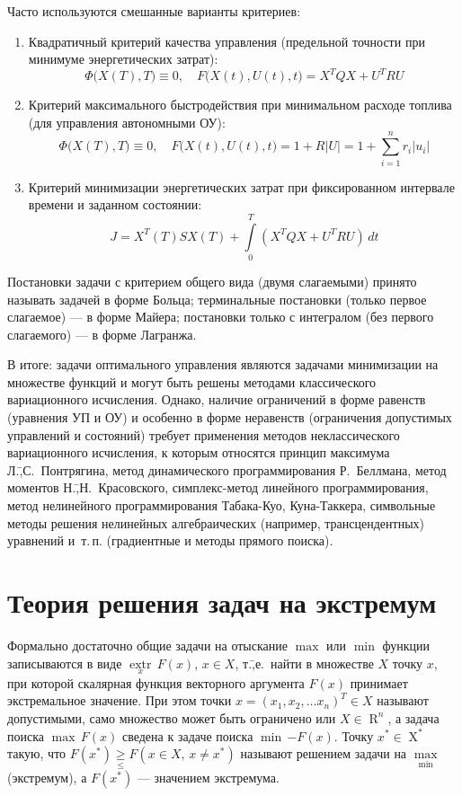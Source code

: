 \documentclass[preprint,russian,a5paper,10pt,twoside,mediummath]{ncc}
\begin{document}
Часто используются смешанные варианты критериев:
\begin{enumerate}[resume]
\item Квадратичный критерий качества управления (предельной точности при минимуме энергетических затрат):
\[ \Phi \bigl( X(T), T \bigr) \equiv 0, \quad F \bigl( X(t), U(t), t \bigr) = X^TQX + U^TRU \]
\item Критерий максимального быстродействия при минимальном расходе топлива (для управления автономными ОУ):
\[ \Phi \bigl( X(T), T \bigr) \equiv 0, \quad F \bigl( X(t), U(t), t \bigr) = 1 + R\left|U\right| = 1 + \sum\limits_{i=1}^{n}{ r_i \left| u_i \right| } \]
\item Критерий минимизации энергетических затрат при фиксированном интервале времени и заданном состоянии: 
\[ J = X^T \left( T \right) S X \left( T \right) + \int\limits_0^T \left( X^TQX + U^TRU \right) \, dt \] 
\end{enumerate}

Постановки задачи с критерием общего вида (двумя слагаемыми) принято называть задачей в форме Больца; терминальные постановки (только первое слагаемое) --- в форме Майера; постановки только с интегралом (без первого слагаемого) --- в форме Лагранжа.

В итоге: задачи оптимального управления являются задачами минимизации на множестве функций и могут быть решены методами классического вариационного исчисления. Однако, наличие ограничений в форме равенств (уравнения УП и ОУ) и особенно в форме неравенств (ограничения допустимых управлений и состояний) требует применения методов неклассического вариационного исчисления, к которым относятся принцип максимума Л.\=,С.~Понтрягина, метод динамического программирования Р.~Беллмана, метод моментов Н.\=,Н.~Красовского, симплекс-метод линейного программирования, метод нелинейного программирования Табака-Куо, Куна-Таккера, символьные методы решения нелинейных алгебраических (например, трансцендентных) уравнений и~т.\,п. (градиентные и методы прямого поиска).





\clearpage
\section{Теория решения задач на экстремум\label{extremum}}
Формально достаточно общие задачи на отыскание $\max$  или $\min$ функции записываются в виде $\underset{x}{\mathop{extr}} \, F \left( x \right) $, $ x \in X $, т.\=,е.~найти в множестве $X$ точку $x$, при которой скалярная функция векторного аргумента $F \left( x \right) $ принимает экстремальное значение. При этом точки $ x = {\left( x_1, x_2, \dots x_n \right)}^T \in X$ называют допустимыми, само множество может быть ограничено или $ X \in \mathop{R}^n $, а задача поиска $ \max \, F\left( x \right) $ сведена к задаче поиска $ \min \, { - F \left( x \right) }$. Точку $ x^* \in \mathop{X}^* $ такую, что $ F \left( x^* \right) \underset{\le}{\ge} F \left( x \in X, \, x \ne x^* \right) $ называют решением задачи на $ \underset{\min}{\max} $ (экстремум), а $ F \left( x^* \right) $ --- значением экстремума.
\end{document}
